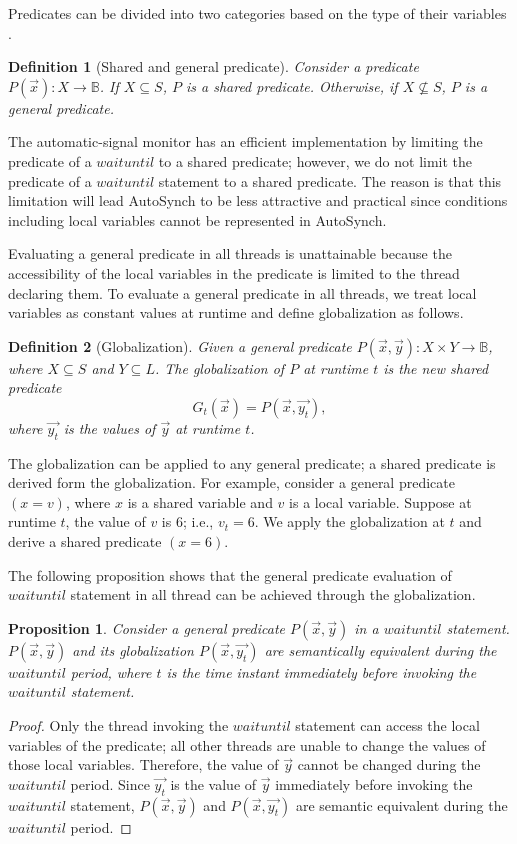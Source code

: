 \documentclass[preprint]{sigplanconf}
\newtheorem{definition}{Definition}
\newtheorem{proposition}{Proposition}
\begin{document}
Predicates can be divided into two categories based on the type of their 
variables \cite{bh05}.
\begin{definition}[Shared and general predicate]
    Consider a predicate $P(\vec{x}): X \rightarrow \mathbb{B}$. If $X 
    \subseteq S$, $P$ 
    is a shared predicate. Otherwise, if $X \not\subseteq S$, $P$ 
    is a general predicate. 
\end{definition}

The automatic-signal monitor has an efficient implementation \cite{kes77} by 
limiting the predicate of a $waituntil$ to a shared predicate; however, 
we do not limit the predicate of a $waituntil$ statement to a shared
predicate. The reason is that this limitation will lead AutoSynch to be less
attractive and practical since conditions including local variables cannot be 
represented in AutoSynch.

Evaluating a general predicate in all threads is unattainable 
because the accessibility of the local variables in the predicate is limited 
to the thread declaring them. To evaluate a general predicate in all 
threads, we treat local variables as constant values at runtime and define 
globalization as follows. 
\begin{definition}[Globalization]
    Given a general predicate $P(\vec{x}, \vec{y}): X \times Y \rightarrow 
    \mathbb{B}$, where $X \subseteq S$ and $Y \subseteq L$. The globalization 
    of $P$ at runtime $t$ is the new shared predicate
    \[
    G_t(\vec{x}) = P(\vec{x}, \vec{y_t}),
    \]
    where $\vec{y_t}$ is the values of $\vec{y}$ at runtime $t$.
\end{definition}

The globalization can be applied to any general predicate; a shared 
predicate is derived form the globalization. For example, consider a 
general predicate $(x = v)$, where $x$ is a shared variable and $v$ is a local
variable. Suppose at runtime $t$, the value of $v$ is $6$; i.e., $v_t=6$. We
apply the globalization at $t$ and derive a shared predicate $(x = 6)$. 

The following proposition shows that the general predicate evaluation of
$waituntil$ statement in all thread can be achieved through the globalization. 
\begin{proposition} \label{pro:glob}
    Consider a general predicate $P(\vec{x}, \vec{y})$ in a $waituntil$ 
    statement. $P(\vec{x}, \vec{y})$ and its globalization 
    $P(\vec{x}, \vec{y_t})$ are semantically equivalent during the $waituntil$ 
    period, where $t$ is the time instant immediately before invoking the 
    $waituntil$ statement.  
\end{proposition}
\begin{proof}
    Only the thread invoking the $waituntil$ statement can access the
    local variables of the predicate; all other threads are unable to change
    the values of those local variables. Therefore, the value of $\vec{y}$
    cannot be changed 
    during the $waituntil$ period. Since $\vec{y_t}$ is the value of $\vec{y}$
    immediately before invoking the $waituntil$ statement, $P(\vec{x}, \vec{y})$
    and $P(\vec{x}, \vec{y_t})$ are semantic equivalent during the $waituntil$
    period. 
\end{proof}
\end{document}
